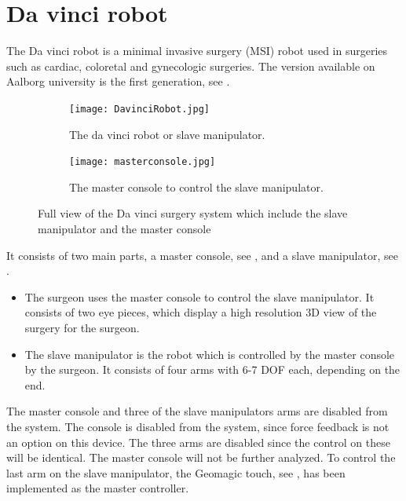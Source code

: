 \section{Da vinci robot}\label{sec:da_vin_rob}

The Da vinci robot is a minimal invasive surgery (MSI) robot used in surgeries such as cardiac, coloretal and gynecologic surgeries\cite{daVinciSurgery}. The version available on Aalborg university is the first generation, see .

\begin{figure}[H]
	\centering
	\begin{subfigure}{.45\textwidth}
		\centering
		\texttt{[image: DavinciRobot.jpg]}
		\caption{The da vinci robot or slave manipulator.}
		\label{fig:davincirobot}
	\end{subfigure}
	\begin{subfigure}{.45\textwidth}
		\centering
		\vspace{12pt}
		\texttt{[image: masterconsole.jpg]}
		\caption{The master console to control the slave manipulator.}
		\label{fig:mastermani}
	\end{subfigure}
\caption{Full view of the Da vinci surgery system which include the slave manipulator and the master console}
\label{fig:fulldavinci}
\end{figure}

It consists of two main parts, a master console, see , and a slave manipulator, see .

\begin{itemize}
\item The surgeon uses the master console to control the slave manipulator. It consists of two eye pieces, which display a high resolution 3D view of the surgery for the surgeon. 
\item The slave manipulator is the robot which is controlled by the master console by the surgeon. It consists of four arms with 6-7 \gls{DOF} each, depending on the end.
\end{itemize}

The master console and three of the slave manipulators arms are disabled from the system. The console is disabled from the system, since force feedback is not an option on this device. The three arms are disabled since the control on these will be identical. The master console will not be further analyzed. To control the last arm on the slave manipulator, the Geomagic touch, see , has been implemented as the master controller.

